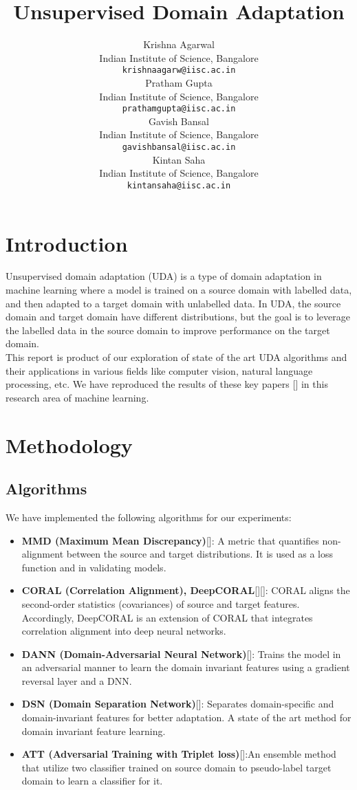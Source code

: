 \documentclass{article}
\title{Unsupervised Domain Adaptation}
\author{ Krishna Agarwal\\%
  Indian Institute of Science, Bangalore\\
  \texttt{krishnaagarw@iisc.ac.in} \\
   \And
  {Pratham Gupta} \\
  Indian Institute of Science, Bangalore\\
  \texttt{prathamgupta@iisc.ac.in} \\
   \And
   {Gavish Bansal} \\
   Indian Institute of Science, Bangalore\\
   \texttt{gavishbansal@iisc.ac.in} \\
   \And
   {Kintan Saha} \\
   Indian Institute of Science, Bangalore\\
   \texttt{kintansaha@iisc.ac.in} \\
}
\begin{document}
\graphicspath{{./images/}}

\maketitle


\begin{abstract}
  
\end{abstract}


\section{Introduction}
Unsupervised domain adaptation (UDA) is a type of domain adaptation in machine learning where a model is trained on a source domain with labelled data, and then adapted to a target domain with unlabelled data.
In UDA, the source domain and target domain have different distributions, but
the goal is to leverage the labelled data in the source domain to improve performance on the target
domain. \\
This report is product of our exploration of state of the art UDA algorithms and their applications in various fields like computer vision, natural language processing, etc. 
We have reproduced the results of these key papers [] in this research area of machine learning.

\section{Methodology}

\subsection{Algorithms}
We have implemented the following algorithms for our experiments:
\begin{itemize}
  \item \textbf{MMD (Maximum Mean Discrepancy)}[]: A metric that quantifies non-alignment between the source and target distributions. It is used as a loss function and in validating models. 
  \item \textbf{CORAL (Correlation Alignment), DeepCORAL}[][]: CORAL aligns the second-order statistics (covariances) of source and target features. Accordingly, DeepCORAL is an extension of CORAL that integrates correlation alignment into deep neural networks.
  \item \textbf{DANN (Domain-Adversarial Neural Network)}[]: Trains the model in an adversarial manner to learn the domain invariant features using a gradient reversal layer and a DNN.
  \item \textbf{DSN (Domain Separation Network)}[]: Separates domain-specific and domain-invariant features for better adaptation. A state of the art method for domain invariant feature learning.
  \item \textbf{ATT (Adversarial Training with Triplet loss)}[]:An ensemble method that utilize two classifier trained on source domain to pseudo-label target domain to learn a classifier for it.
\end{itemize}
\end{document}
